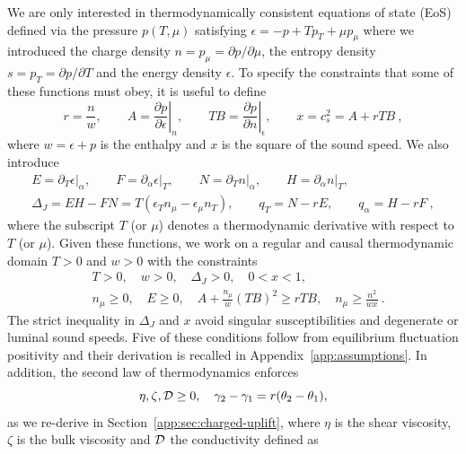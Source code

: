 We are only interested in thermodynamically consistent equations of state (EoS) defined via the pressure $p(T,\mu)$ satisfying $\epsilon=-p+Tp_T+\mu p_\mu$ where we introduced the charge density $n=p_\mu=\partial p/\partial\mu$, the entropy density $s=p_T=\partial p/\partial T$ and the energy density $\epsilon$. To specify the constraints that some of these functions must obey, it is useful to define
\begin{equation}\label{eq:thermo}
 r=\frac n w,\qquad A=\left.\frac{\partial p}{\partial\epsilon}\right|_n,
 \qquad TB=\left.\frac{\partial p}{\partial n}\right|_\epsilon,
 \qquad x=c_s^2=A+rTB~,
\end{equation}
where $w=\epsilon+p$ is the enthalpy and $x$ is the square of the sound speed. We also introduce
\begin{equation}\label{eq:suscept}
 \begin{gathered}
 E=\left.\partial_T\epsilon\right|_\alpha,\qquad
 F=\left.\partial_\alpha\epsilon\right|_T,\qquad
 N=\left.\partial_T n\right|_\alpha,\qquad
 H=\left.\partial_\alpha n\right|_T,\\[3pt]
 \Delta_J=EH-FN=T(\epsilon_Tn_\mu-\epsilon_\mu n_T),\qquad
 q_T=N-rE,\qquad q_\alpha=H-rF~,
 \end{gathered}
\end{equation}
where the subscript $T$ (or $\mu$) denotes a thermodynamic derivative with respect to $T$ (or $\mu$). Given these functions, we work on a regular and causal thermodynamic domain $T>0$ and $w>0$ with the constraints
\begin{equation}\label{eq:domain}
\begin{split}
 &T>0,\quad w>0,\quad\Delta_J>0,\quad 0<x<1,\\
 &n_\mu\geq0,\quad E\geq0,\quad
 A+\frac{n_\mu}{w}(TB)^2\geq rTB,\quad
 n_\mu\geq\frac{n^2}{wx}~.
 \end{split}
\end{equation}
The strict inequality in $\Delta_J$ and $x$ avoid singular susceptibilities and degenerate or luminal sound speeds. Five of these conditions follow from equilibrium fluctuation positivity \cite{HoultKovtun} and their derivation is recalled in Appendix~\ref{app:assumptions}. In addition, the second law of thermodynamics enforces \cite{HoultKovtun}
\begin{equation}\label{eq:thermo-domain}
\eta,\zeta,\mathcal D\geq0,\quad  \gamma_2-\gamma_1=r(\theta_2-\theta_1), 
\end{equation}
as we re-derive in Section~\ref{app:sec:charged-uplift}, where $\eta$ is the shear viscosity, $\zeta$ is the bulk viscosity and $\mathcal D$ the conductivity defined as 
